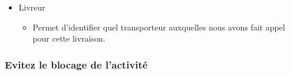 \begin{itemize}
\begin{itemize}
\begin{itemize}
					\item Livreur
					
						\begin{itemize}
						
							\item  Permet d’identifier quel transporteur auxquelles nous avons fait appel pour cette livraison. 						
						
						\end{itemize}						  				
				
				\end{itemize}
		
		\end{itemize}

\end{itemize} 

\vertspace

\subsubsection{Evitez le blocage de l’activité}

